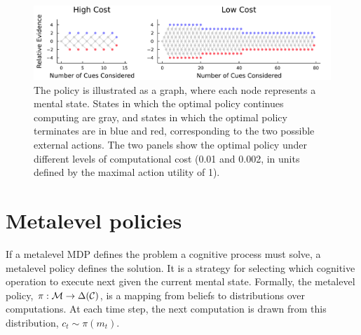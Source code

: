 \begin{figure}[tb!]
  \centering
  \includegraphics[width=\textwidth]{figs/policies.pdf}
  \caption{ 
    The policy is illustrated as a graph, where each node represents a mental state. States in which the optimal policy continues computing are gray, and states in which the optimal policy terminates are in blue and red, corresponding to the two possible external actions. The two panels show the optimal policy under different levels of computational cost (0.01 and 0.002, in units defined by the maximal action utility of 1).
  }
  \label{fig:tally-policies}
\end{figure}

\section{Metalevel policies}\label{sec:metamdp-policy}

If a metalevel MDP defines the problem a cognitive process must solve, a metalevel policy defines the solution. It is a strategy for selecting which cognitive operation to execute next given the current mental state. Formally, the metalevel policy, $\pi: \mathcal{M} \rightarrow \Delta(\mathcal{C})$, is a mapping from beliefs to distributions over computations. At each time step, the next computation is drawn from this distribution, $c_t \sim \pi(m_t)$.

